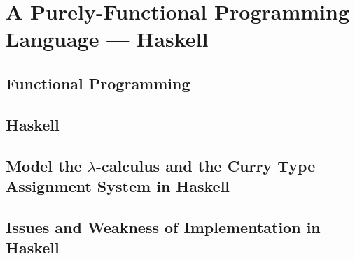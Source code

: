 \chapter{A Purely-Functional Programming Language --- Haskell}

\section{Functional Programming}
\section{Haskell}
\section{Model the $\lambda$-calculus and the Curry Type Assignment System in Haskell}
\section{Issues and Weakness of Implementation in Haskell }

